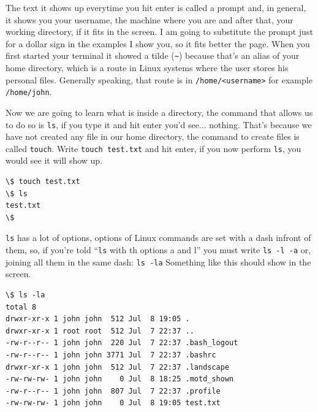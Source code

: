 \documentclass[a4paper]{article}
\begin{document}
The text it shows up everytime you hit enter is called a prompt and, in general,
it shows you your username, the machine where you are and after that, your
working directory, if it fits in the screen. I am going to substitute the prompt
just for a dollar sign in the examples I show you, so it fits better the page.
When you first started your terminal it showed a tilde (\verb!~!) because that's
an alias of your home directory, which is a route in Linux systems where the
user stores his personal files. Generally speaking, that route is in
\verb!/home/<username>! for example \verb!/home/john!.

Now we are going to learn what is inside a directory, the command that allows us
to do so is \verb!ls!, if you type it and hit enter you'd see... nothing. That's
because we have not created any file in our home directory, the command to
create files is called \verb"touch". Write \verb!touch test.txt! and hit enter,
if you now perform \verb!ls!, you would see it will show up.

\noindent
\begin{minipage}[H]{\linewidth}
\mbox{}
\begin{lstlisting}[style=terminalStyle]
\$ touch test.txt
\$ ls
test.txt
\$
\end{lstlisting}
\end{minipage}

\verb!ls! has a lot of options, options of Linux commands are set with a dash
infront of them, so, if you're told ``\verb!ls! with th options a and l'' you
must write \verb!ls -l -a! or, joining all them in the same dash: \verb!ls -la!
Something like this should show in the screen.

\noindent
\begin{minipage}[H]{\linewidth}
\mbox{}
\begin{lstlisting}[style=terminalStyle]
\$ ls -la
total 8
drwxr-xr-x 1 john john  512 Jul  8 19:05 .
drwxr-xr-x 1 root root  512 Jul  7 22:37 ..
-rw-r--r-- 1 john john  220 Jul  7 22:37 .bash_logout
-rw-r--r-- 1 john john 3771 Jul  7 22:37 .bashrc
drwxr-xr-x 1 john john  512 Jul  7 22:37 .landscape
-rw-rw-rw- 1 john john    0 Jul  8 18:25 .motd_shown
-rw-r--r-- 1 john john  807 Jul  7 22:37 .profile
-rw-rw-rw- 1 john john    0 Jul  8 19:05 test.txt
\end{lstlisting}
\end{minipage}

\end{document}
